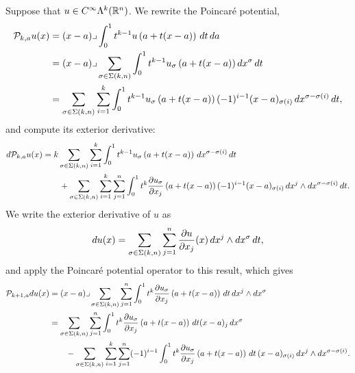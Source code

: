 \documentclass[10pt,letterpaper]{article}
\begin{document}
Suppose that $u \in C^{\infty}\Lambda^{k}({\mathbb R}^n)$.
We rewrite the Poincar\'e potential,
\begin{align*}
    {\mathcal P}_{k,a} u(x) 
    &= 
    (x-a)\lrcorner \int_{0}^{1} t^{k-1} u\left(a+t(x-a)\right)\,dt\,da\;
    \\&
    = 
    (x-a)\lrcorner 
    \sum_{\sigma \in \Sigma(k,n)}
    \int_{0}^{1} 
    t^{k-1} u_{\sigma}\left(a+t(x-a)\right) dx^{\sigma} \,dt 
    \\&
    = 
    \sum_{\sigma \in \Sigma(k,n)} \sum_{i=1}^{k}
    \int_{0}^{1} 
    t^{k-1} u_{\sigma}\left(a+t(x-a)\right) (-1)^{i-1} (x-a)_{\sigma(i) } \,dx^{\sigma-\sigma(i)} \,dt 
    ,
\end{align*}
and compute its exterior derivative:
\begin{align*}
    d {\mathcal P}_{k,a} u(x) 
    &= 
    k
    \sum_{\sigma \in \Sigma(k,n)} \sum_{i=1}^{k}
    \int_{0}^{1} 
    t^{k-1} u_{\sigma}\left(a+t(x-a)\right) \,dx^{\sigma-\sigma(i)} \,dt 
    \\&\qquad
    + 
    \sum_{\sigma \in \Sigma(k,n)} \sum_{i=1}^{k} \sum_{j=1}^{n}
    \int_{0}^{1} 
    t^{k} \frac{ \partial u_{\sigma} }{\partial x_{j}}\left(a+t(x-a)\right) (-1)^{i-1} (x-a)_{\sigma(i) } \,dx^{j} \wedge dx^{\sigma-\sigma(i)} \,dt 
    .
\end{align*}
We write the exterior derivative of $u$ as 
\begin{align*}
    d u(x)
    =
    \sum_{\sigma \in \Sigma(k,n)} \sum_{j=1}^{n}
    \frac{ \partial u }{\partial x_{j}}(x) \,dx^{j} \wedge dx^{\sigma} \,dt 
    ,
\end{align*}
and apply the Poincar\'e potential operator to this result, which gives 
\begin{align*}
    {\mathcal P}_{k+1,a} d u(x)
    &=
    (x-a)\lrcorner 
    \sum_{\sigma \in \Sigma(k,n)} \sum_{j=1}^{n}
    \int_{0}^{1} t^{k} \frac{ \partial u_{\sigma} }{\partial x_{j}}\left(a+t(x-a)\right) \,dt 
    \,dx^{j} \wedge dx^{\sigma}
    \\&
    = 
    \sum_{\sigma \in \Sigma(k,n)} \sum_{j=1}^{n}
    \int_{0}^{1} t^{k} \frac{ \partial u_{\sigma} }{\partial x_{j}}\left(a+t(x-a)\right) \,dt (x-a)_{j}
    \,dx^{\sigma}
    \\&\qquad 
    - 
    \sum_{\sigma \in \Sigma(k,n)} \sum_{i=1}^{k} \sum_{j=1}^{n}
    (-1)^{i-1}
    \int_{0}^{1} t^{k} \frac{ \partial u_{\sigma} }{\partial x_{j}}\left(a+t(x-a)\right) \,dt 
    \,(x-a)_{\sigma(i)} 
    \,dx^{j} \wedge dx^{\sigma-\sigma(i)}
    .
\end{align*}
\end{document}
